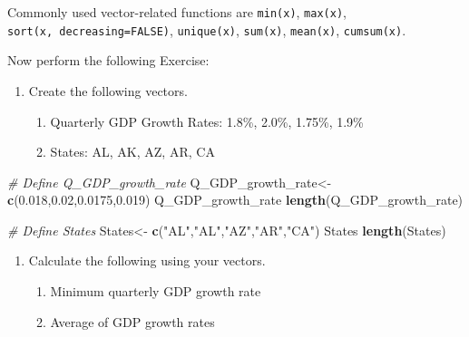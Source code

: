 \documentclass[
]{article}
\newenvironment{Shaded}{\begin{snugshade}}{\end{snugshade}}
\newcommand{\CommentTok}[1]{\textcolor[rgb]{0.56,0.35,0.01}{\textit{#1}}}
\newcommand{\FloatTok}[1]{\textcolor[rgb]{0.00,0.00,0.81}{#1}}
\newcommand{\FunctionTok}[1]{\textcolor[rgb]{0.13,0.29,0.53}{\textbf{#1}}}
\newcommand{\NormalTok}[1]{#1}
\newcommand{\OtherTok}[1]{\textcolor[rgb]{0.56,0.35,0.01}{#1}}
\newcommand{\StringTok}[1]{\textcolor[rgb]{0.31,0.60,0.02}{#1}}
\providecommand{\tightlist}{%
  \setlength{\itemsep}{0pt}\setlength{\parskip}{0pt}}
\begin{document}
Commonly used vector-related functions are \texttt{min(x)},
\texttt{max(x)}, \texttt{sort(x,\ decreasing=FALSE)},
\texttt{unique(x)}, \texttt{sum(x)}, \texttt{mean(x)},
\texttt{cumsum(x)}.

Now perform the following Exercise:

\begin{enumerate}
\def\labelenumi{\arabic{enumi}.}
\tightlist
\item
  Create the following vectors.

  \begin{enumerate}
  \def\labelenumii{\alph{enumii}.}
  \tightlist
  \item
    Quarterly GDP Growth Rates: 1.8\%, 2.0\%, 1.75\%, 1.9\%
  \item
    States: AL, AK, AZ, AR, CA
  \end{enumerate}
\end{enumerate}

\begin{Shaded}
\begin{Highlighting}[]
\CommentTok{\# Define Q\_GDP\_growth\_rate}
\NormalTok{Q\_GDP\_growth\_rate}\OtherTok{\textless{}{-}} \FunctionTok{c}\NormalTok{(}\FloatTok{0.018}\NormalTok{,}\FloatTok{0.02}\NormalTok{,}\FloatTok{0.0175}\NormalTok{,}\FloatTok{0.019}\NormalTok{)}
\NormalTok{Q\_GDP\_growth\_rate}
\FunctionTok{length}\NormalTok{(Q\_GDP\_growth\_rate)}

\CommentTok{\# Define States}
\NormalTok{States}\OtherTok{\textless{}{-}} \FunctionTok{c}\NormalTok{(}\StringTok{"AL"}\NormalTok{,}\StringTok{"AL"}\NormalTok{,}\StringTok{"AZ"}\NormalTok{,}\StringTok{"AR"}\NormalTok{,}\StringTok{"CA"}\NormalTok{)}
\NormalTok{States}
\FunctionTok{length}\NormalTok{(States)}
\end{Highlighting}
\end{Shaded}

\begin{enumerate}
\def\labelenumi{\arabic{enumi}.}
\setcounter{enumi}{1}
\tightlist
\item
  Calculate the following using your vectors.

  \begin{enumerate}
  \def\labelenumii{\alph{enumii}.}
  \tightlist
  \item
    Minimum quarterly GDP growth rate
  \item
    Average of GDP growth rates
  \end{enumerate}
\end{enumerate}
\end{document}
